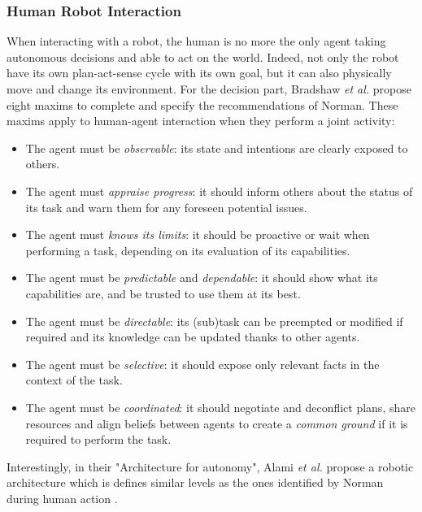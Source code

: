 \documentclass[a4paper,11pt,twoside]{StyleThese}
\begin{document}
\subsubsection{Human Robot Interaction}
When interacting with a robot, the human is no more the only agent taking autonomous decisions and able to act on the world. Indeed, not only the robot have its own plan-act-sense cycle with its own goal, but it can also physically move and change its environment. For the decision part, Bradshaw \textit{et al.} \cite{bradshaw2011human} propose eight maxims to complete and specify the recommendations of Norman. These maxims apply to human-agent interaction when they perform a joint activity:
\begin{itemize}
\item The agent must be \textit{observable}: its state and intentions are clearly exposed to others.
\item The agent must \textit{appraise progress}: it should inform others about the status of its task and warn them for any foreseen potential issues.
\item The agent must \textit{knows its limits}: it should be proactive or wait when performing a task, depending on its evaluation of its capabilities.
\item The agent must be \textit{predictable} and \textit{dependable}: it should show what its capabilities are, and be trusted to use them at its best.
\item The agent must be \textit{directable}: its (sub)task can be preempted or modified if required and its knowledge can be updated thanks to other agents.
\item The agent must be \textit{selective}: it should expose only relevant facts in the context of the task.
\item The agent must be \textit{coordinated}: it should negotiate and deconflict plans, share resources and align beliefs between agents to create a \textit{common ground} if it is required to perform the task.
\end{itemize}


Interestingly, in their "Architecture for autonomy", Alami \textit{et al.} propose a robotic architecture which is defines similar levels as the ones identified by Norman during human action \cite{alami1998architecture}.
\end{document}

